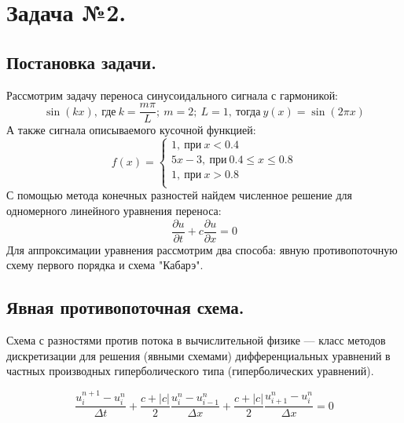 \section{Задача №2.}
\subsection{Постановка задачи.}
Рассмотрим задачу переноса синусоидального сигнала с гармоникой: $$\sin(kx),~ \text{где}~ k=\frac{m\pi}{L}; ~m=2; ~L=1, ~\text{тогда}~ y(x)=\sin(2\pi x)$$
А также сигнала описываемого кусочной функцией: 
\begin{equation}
    f(x)=
    \begin{cases}
        1, ~\text{при}~ x<0.4 \\
        5x-3,~ \text{при}~ 0.4 \leq x \leq 0.8 \\
        1, ~\text{при}~ x>0.8 \\
    \end{cases}
\end{equation}
С помощью метода конечных разностей найдем численное решение для одномерного линейного уравнения переноса:
$$\frac{\partial u}{\partial t}+c \frac{\partial u}{\partial x}=0$$
Для аппроксимации уравнения рассмотрим два способа: явную противопоточную схему первого порядка и схема "Кабарэ". 
\subsection{Явная противопоточная схема.}
Схема с разностями против потока в вычислительной физике — класс методов дискретизации для решения (явными схемами) дифференциальных уравнений в частных производных гиперболического типа (гиперболических уравнений).

\begin{equation}
    \frac{u_i^{n+1}-u_i^n}{\Delta t}+\frac{c+|c|}{2}\frac{u_i^n-u_{i-1}^n}{\Delta x}+\frac{c+|c|}{2}\frac{u_{i+1}^n-u_{i}^n}{\Delta x}=0
\end{equation}

